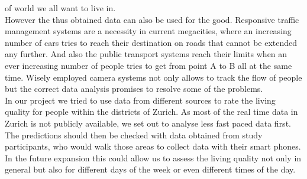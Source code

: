 \documentclass[letterpaper]{article}
\begin{document}
of world we all want to live in.\\
\indent However the thus obtained data can also be used for the good. Responsive traffic management systems are a necessity in current
megacities, where an increasing number of cars tries to reach their destination on roads that cannot be extended any further.
And also the public transport systems reach their limits when an ever increasing number of people tries to get from point A to B
all at the same time. Wisely employed camera systems not only allows to track the flow of people but the correct data analysis promises to resolve
some of the problems.\\
\indent In our project we tried to use data from different sources to rate the living quality for people within the districts of Zurich.
As most of the real time data in Zurich is not publicly available, we set out to analyse less fast paced data first. The predictions
should then be checked with data obtained from study participants, who would walk those areas to collect data with their smart phones.
In the future expansion this could allow us to assess the living quality not only in general but also for different days of the week or even
different times of the day.
\end{document}
